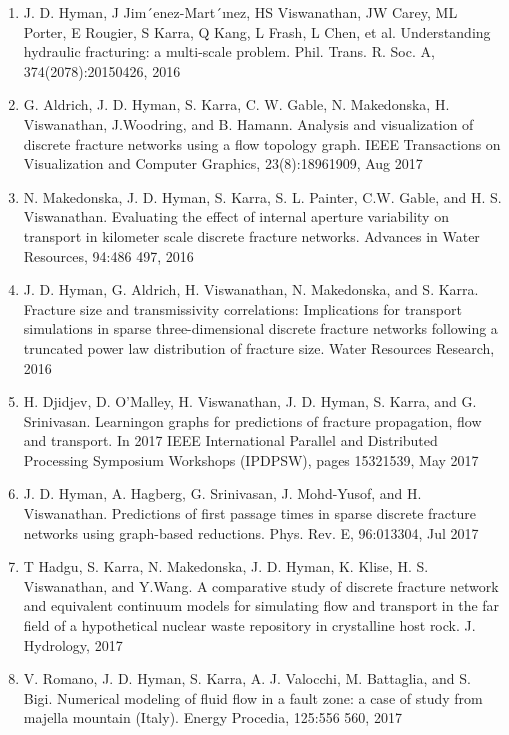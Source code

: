 \documentclass[letterpaper,10pt,english]{sphinxmanual}
\begin{document}
\begin{enumerate}
\item {} 
J. D. Hyman, J Jim´enez-Mart´ınez, HS Viswanathan, JW Carey, ML Porter, E Rougier, S Karra, Q Kang, L Frash, L Chen, et al. Understanding hydraulic fracturing: a multi-scale problem. Phil. Trans. R. Soc. A, 374(2078):20150426, 2016

\item {} 
G. Aldrich, J. D. Hyman, S. Karra, C. W. Gable, N. Makedonska, H. Viswanathan, J.Woodring, and B. Hamann. Analysis and visualization of discrete fracture networks using a flow topology graph. IEEE Transactions on Visualization and Computer Graphics, 23(8):1896\textendash{}1909, Aug 2017

\item {} 
N. Makedonska, J. D. Hyman, S. Karra, S. L. Painter, C.W. Gable, and H. S. Viswanathan. Evaluating the effect of internal aperture variability on transport in kilometer scale discrete fracture networks. Advances in Water Resources, 94:486 \textendash{} 497, 2016

\item {} 
J. D. Hyman, G. Aldrich, H. Viswanathan, N. Makedonska, and S. Karra. Fracture size and transmissivity correlations: Implications for transport simulations in sparse three-dimensional discrete fracture networks following a truncated power law distribution of fracture size. Water Resources Research, 2016

\item {} 
H. Djidjev, D. O’Malley, H. Viswanathan, J. D. Hyman, S. Karra, and G. Srinivasan. Learningon graphs for predictions of fracture propagation, flow and transport. In 2017 IEEE International Parallel and Distributed Processing Symposium Workshops (IPDPSW), pages 1532\textendash{}1539, May 2017

\item {} 
J. D. Hyman, A. Hagberg, G. Srinivasan, J. Mohd-Yusof, and H. Viswanathan. Predictions of first passage times in sparse discrete fracture networks using graph-based reductions. Phys. Rev. E, 96:013304, Jul 2017

\item {} 
T Hadgu, S. Karra, N. Makedonska, J. D. Hyman, K. Klise, H. S. Viswanathan, and Y.Wang. A comparative study of discrete fracture network and equivalent continuum models for simulating flow and transport in the far field of a hypothetical nuclear waste repository in crystalline host rock. J. Hydrology, 2017

\item {} 
V. Romano, J. D. Hyman, S. Karra, A. J. Valocchi, M. Battaglia, and S. Bigi. Numerical modeling of fluid flow in a fault zone: a case of study from majella mountain (Italy). Energy Procedia, 125:556 \textendash{} 560, 2017


\end{enumerate}
\end{document}
